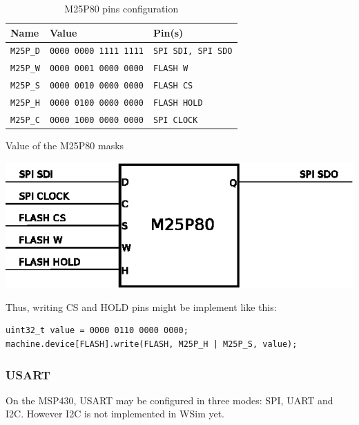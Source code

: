 \documentclass[a4paper,10pt]{report}
\begin{document}
\begin{table}[!h]
  \begin{minipage}[b]{0.50\linewidth}
    \begin{center}
    \begin{tabular}{|l|l|l|}
    \hline
      \rowcolor[gray]{0.9} \textbf{Name} & \textbf{Value} & \textbf{Pin(s)} \\
    \hline
      \verb$M25P_D$ & \verb$0000 0000 1111 1111$ & \verb$SPI SDI, SPI SDO$ \\
    \hline
      \verb$M25P_W$ & \verb$0000 0001 0000 0000$ & \verb$FLASH W$ \\
    \hline
      \verb$M25P_S$ & \verb$0000 0010 0000 0000$ & \verb$FLASH CS$ \\
    \hline
      \verb$M25P_H$ & \verb$0000 0100 0000 0000$ & \verb$FLASH HOLD$ \\
    \hline
      \verb$M25P_C$ & \verb$0000 1000 0000 0000$ & \verb$SPI CLOCK$ \\
    \hline
    \end{tabular}
    \end{center}
    \caption{Value of the M25P80 masks}
    \label{m25p80-masks}
  \end{minipage}\hfill
    \begin{minipage}[b]{0.40\linewidth}
    \begin{center}
      \centering \includegraphics[scale=0.8]{figures/wsim_m25p80.eps}
    \end{center}
    \caption{M25P80 pins configuration}
    \label{wsim-m25p80}
  \end{minipage}
\end{table}

\medskip
Thus, writing CS and HOLD pins might be implement like this:
\begin{verbatim}
uint32_t value = 0000 0110 0000 0000;
machine.device[FLASH].write(FLASH, M25P_H | M25P_S, value);
\end{verbatim}

\subsubsection{USART}
On the MSP430, USART may be configured in three modes: SPI, UART and I2C. However I2C is not implemented in WSim yet.\\
\end{document}
